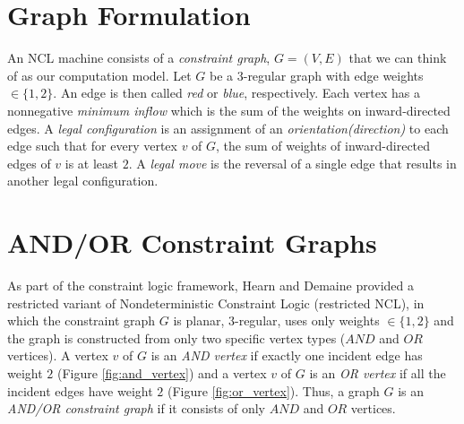\section{Graph Formulation}\label{sec:formalism}
An NCL machine consists of a \textit{constraint graph}, $G = (V,E)$ that we can think of as our computation model.
Let $G$ be a $3$-regular graph with edge weights $ \in \{1, 2\}$. An edge is then called \textit{red} or \textit{blue}, respectively.
Each vertex has a nonnegative \textit{minimum inflow} which is the sum of the weights on inward-directed edges. A \textit{legal configuration}
is an assignment of an \textit{orientation(direction)} to each edge such that for every vertex $v$ of $G$, the sum of weights of inward-directed
edges of $v$ is at least $2$. A \textit{legal move} is the reversal of a single edge that results in another legal configuration.


\section{AND/OR Constraint Graphs} \label{sec:contraint_graph}
As part of the constraint logic framework,  Hearn and Demaine provided a restricted variant of Nondeterministic Constraint Logic (restricted NCL),
in which the constraint graph $G$ is planar, $3$-regular, uses only weights $ \in \{1,2\}$ and the graph is constructed from only two specific vertex
types ($AND$ and $OR$ vertices). A vertex $v$ of $G$ is an \textit{AND vertex} if exactly one incident edge has weight $2$ (Figure \ref{fig:and_vertex}) and
a vertex $v$ of $G$ is an \textit{OR vertex} if all the incident edges have weight $2$ (Figure \ref{fig:or_vertex}). Thus, a graph
$G$ is an \textit{AND/OR constraint graph} if it consists of only $AND$ and $OR$ vertices.

